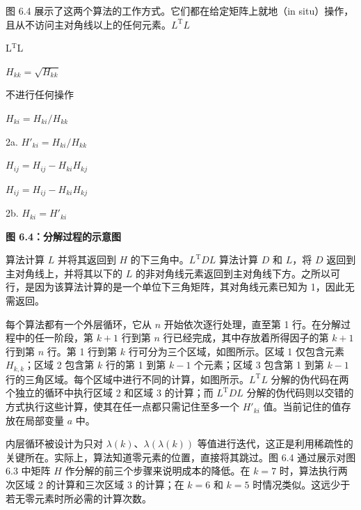 \documentclass[10pt,a4paper]{book}
\theoremstyle{thmstyle} %
\theoremstyle{defstyle} %
\theoremstyle{prostyle} %
\begin{document}
图 6.4 展示了这两个算法的工作方式。它们都在给定矩阵上就地（in situ）操作，且从不访问主对角线以上的任何元素。$L^{\mathrm{T}}L$





L$^{\mathrm{T}}$L



$H_{kk}=\sqrt{H_{kk}}$



不进行任何操作



$H_{ki}=H_{ki}/H_{kk}$



2a. $H'_{ki}=H_{ki}/H_{kk}$



$H_{ij}=H_{ij}-H_{ki}H_{kj}$



$H_{ij}=H_{ij}-H_{ki}H_{kj}$



2b. $H_{ki}=H'_{ki}$



\noindent\textbf{图 6.4：分解过程的示意图}





算法计算 $L$ 并将其返回到 $H$ 的下三角中。$L^{\mathrm{T}}DL$ 算法计算 $D$ 和 $L$，将 $D$ 返回到主对角线上，并将其以下的 $L$ 的非对角线元素返回到主对角线下方。之所以可行，是因为该算法计算的是一个单位下三角矩阵，其对角线元素已知为 1，因此无需返回。



每个算法都有一个外层循环，它从 $n$ 开始依次逐行处理，直至第 1 行。在分解过程中的任一阶段，第 $k+1$ 行到第 $n$ 行已经完成，其中存放着所得因子的第 $k+1$ 行到第 $n$ 行。第 1 行到第 $k$ 行可分为三个区域，如图所示。区域 1 仅包含元素 $H_{k,k}$；区域 2 包含第 $k$ 行的第 1 到第 $k-1$ 个元素；区域 3 包含第 1 到第 $k-1$ 行的三角区域。每个区域中进行不同的计算，如图所示。$L^{\mathrm{T}}L$ 分解的伪代码在两个独立的循环中执行区域 2 和区域 3 的计算；而 $L^{\mathrm{T}}DL$ 分解的伪代码则以交错的方式执行这些计算，使其在任一点都只需记住至多一个 $H'_{ki}$ 值。当前记住的值存放在局部变量 $a$ 中。



内层循环被设计为只对 $\lambda(k)$、$\lambda(\lambda(k))$ 等值进行迭代，这正是利用稀疏性的关键所在。实际上，算法知道零元素的位置，直接将其跳过。图 6.4 通过展示对图 6.3 中矩阵 $H$ 作分解的前三个步骤来说明成本的降低。在 $k=7$ 时，算法执行两次区域 2 的计算和三次区域 3 的计算；在 $k=6$ 和 $k=5$ 时情况类似。这远少于若无零元素时所必需的计算次数。
\end{document}
